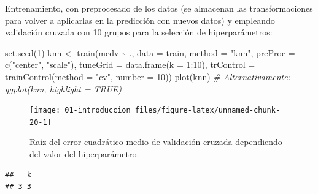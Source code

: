 \documentclass[
]{book}
\newenvironment{Shaded}{\begin{snugshade}}{\end{snugshade}}
\newcommand{\AttributeTok}[1]{\textcolor[rgb]{0.77,0.63,0.00}{#1}}
\newcommand{\CommentTok}[1]{\textcolor[rgb]{0.56,0.35,0.01}{\textit{#1}}}
\newcommand{\DecValTok}[1]{\textcolor[rgb]{0.00,0.00,0.81}{#1}}
\newcommand{\FunctionTok}[1]{\textcolor[rgb]{0.00,0.00,0.00}{#1}}
\newcommand{\NormalTok}[1]{#1}
\newcommand{\OtherTok}[1]{\textcolor[rgb]{0.56,0.35,0.01}{#1}}
\newcommand{\SpecialCharTok}[1]{\textcolor[rgb]{0.00,0.00,0.00}{#1}}
\newcommand{\StringTok}[1]{\textcolor[rgb]{0.31,0.60,0.02}{#1}}
\theoremstyle{break}
\theoremstyle{definition}
\theoremstyle{definition}
\theoremstyle{definition}
\theoremstyle{definition}
\theoremstyle{remark}
\begin{document}
Entrenamiento, con preprocesado de los datos (se almacenan las transformaciones para volver a aplicarlas en la predicción con nuevos datos) y empleando validación cruzada con 10 grupos para la selección de hiperparámetros:

\begin{Shaded}
\begin{Highlighting}[]
\FunctionTok{set.seed}\NormalTok{(}\DecValTok{1}\NormalTok{)}
\NormalTok{knn }\OtherTok{\textless{}{-}} \FunctionTok{train}\NormalTok{(medv }\SpecialCharTok{\textasciitilde{}}\NormalTok{ ., }\AttributeTok{data =}\NormalTok{ train,}
             \AttributeTok{method =} \StringTok{"knn"}\NormalTok{,}
             \AttributeTok{preProc =} \FunctionTok{c}\NormalTok{(}\StringTok{"center"}\NormalTok{, }\StringTok{"scale"}\NormalTok{),}
             \AttributeTok{tuneGrid =} \FunctionTok{data.frame}\NormalTok{(}\AttributeTok{k =} \DecValTok{1}\SpecialCharTok{:}\DecValTok{10}\NormalTok{),}
             \AttributeTok{trControl =} \FunctionTok{trainControl}\NormalTok{(}\AttributeTok{method =} \StringTok{"cv"}\NormalTok{, }\AttributeTok{number =} \DecValTok{10}\NormalTok{))}
\FunctionTok{plot}\NormalTok{(knn) }\CommentTok{\# Alternativamente: ggplot(knn, highlight = TRUE)}
\end{Highlighting}
\end{Shaded}

\begin{figure}[!htb]

{\centering \texttt{[image: 01-introduccion\_files/figure-latex/unnamed-chunk-20-1]} 

}

\caption{Raíz del error cuadrático medio de validación cruzada dependiendo del valor del hiperparámetro.}\label{fig:unnamed-chunk-20}
\end{figure}

\begin{Shaded}
\end{Shaded}

\begin{verbatim}
##   k
## 3 3
\end{verbatim}

\begin{Shaded}
\end{Shaded}
\end{document}
